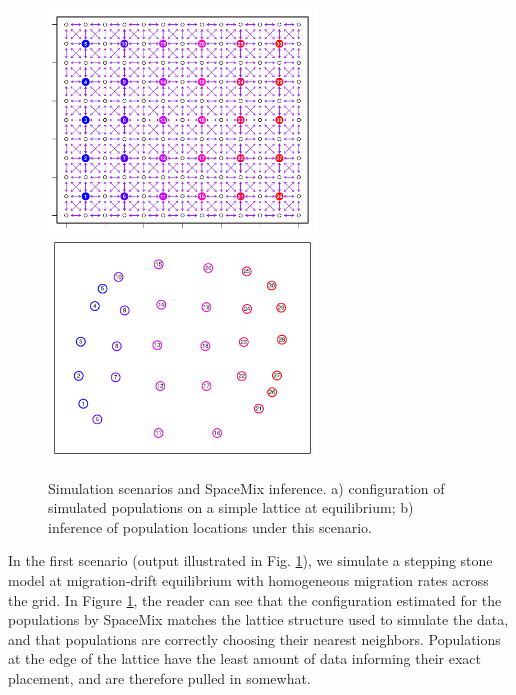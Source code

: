 \documentclass[12pt]{article}
\begin{document}
\begin{figure}
	\centering
			{\includegraphics[width=2.8in,height=2.33in]{figs/sims/basic_lattice.png}}
			{\includegraphics[width=2.8in,height=2.33in]{figs/sims/GeoGenMap_lattice.pdf}}
	\caption{Simulation scenarios and SpaceMix inference.  a) configuration of simulated populations on a simple lattice at equilibrium; b) inference of population locations under this scenario.}\label{sfig:lattice_scenarios}
\end{figure}

In the first scenario (output illustrated in Fig. \ref{sfig:lattice_scenarios}), we simulate a stepping stone model at migration-drift equilibrium with homogeneous migration rates across the grid. In Figure \ref{sfig:lattice_scenarios}, the reader can see that the configuration estimated for the populations by SpaceMix matches the lattice structure used to simulate the data, and that populations are correctly choosing their nearest neighbors.  Populations at the edge of the lattice have the least amount of data informing their exact placement, and are therefore pulled in somewhat.
\end{document}
